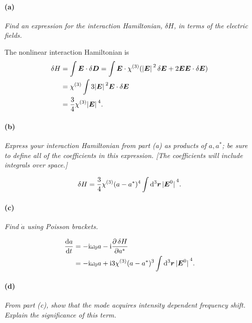 \documentclass[hyperref, a4paper]{article}
\newcommand*{\ii}{\mathrm{i}}
\begin{document}
\paragraph*{(a)} \textit{Find an expression for the interaction Hamiltonian, $\delta H$, in terms of the electric fields.} 

The nonlinear interaction Hamiltonian is 
\begin{equation}
    \begin{aligned}
        \var{H} &= \int \vb*{E} \cdot \var{\vb*{D}}
        = \int \vb*{E} \cdot \chi^{(3)} (\abs*{\vb*{E}}^2 \var{\vb*{E}} + 2 \vb*{E} \vb*{E} \cdot \var{\vb*{E}}) \\
        &= \chi^{(3)} \int 3 \abs*{\vb*{E}}^2 \vb*{E} \cdot \var{\vb*{E}} \\
        &= \frac{3}{4} \chi^{(3)} \abs*{\vb*{E}}^4.
    \end{aligned}
\end{equation}

\paragraph*{(b)} \textit{Express your interaction Hamiltonian from part (a) as products of $a, a^*$; be sure to define all of the coefficients in this expression. [The coefficients will include integrals over space.]} 

\begin{equation}
    \var{H} = \frac{3}{4} \chi^{(3)} (a - a^*)^4 \int \dd[3]{\vb*{r}} \abs*{\vb*{E}^0}^4.
\end{equation}

\paragraph*{(c)} \textit{Find $\dot{a}$ using Poisson brackets.} 

\begin{equation}
    \begin{aligned}
        \dv{a}{t} &= - \ii \omega_0 a - \ii \pdv{\var{H}}{a^*} \\
        &= - \ii \omega_0 a + \ii 3 \chi^{(3)} (a - a^*)^3 \int \dd[3]{\vb*{r}} \abs*{\vb*{E}^0}^4.
    \end{aligned}
    \label{eq:eom-chi3-a}
\end{equation}

\paragraph*{(d)} \textit{From part (c), show that the mode acquires intensity dependent frequency shift. Explain the significance of this term.} 
\end{document}
